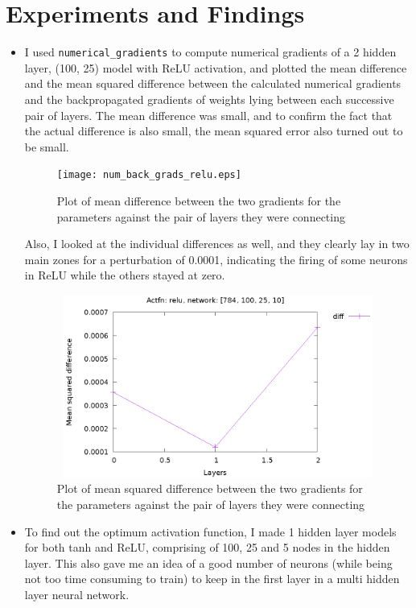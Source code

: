 \documentclass[12pt, a4paper]{article}
\begin{document}
\section{Experiments and Findings}
\begin{itemize}
\item I used \texttt{numerical\_gradients} to compute numerical gradients of a 2 hidden layer, (100, 25) model with ReLU activation, and plotted the mean difference and the mean squared difference between the calculated numerical gradients and the backpropagated gradients of weights lying between each successive pair of layers. The mean difference was small, and to confirm the fact that the actual difference is also small, the mean squared error also turned out to be small. 

\begin{figure}[h!]
\centering
\texttt{[image: num\_back\_grads\_relu.eps]}
\caption{Plot of mean difference between the two gradients for the parameters against the pair of layers they were connecting}
\end{figure}

Also, I looked at the individual differences as well, and they clearly lay in two main zones for a perturbation of 0.0001, indicating the firing of some neurons in ReLU while the others stayed at zero.


\begin{figure}[h!]
\centering
\includegraphics[width=12cm, height=6cm]{num_back_grads_relu_var.eps}
\caption{Plot of mean squared difference between the two gradients for the parameters against the pair of layers they were connecting}
\end{figure}

\item To find out the optimum activation function, I made 1 hidden layer models for both tanh and ReLU, comprising of 100, 25 and 5 nodes in the hidden layer. This also gave me an idea of a good number of neurons (while being not too time consuming to train) to keep in the first layer in a multi hidden layer neural network. 


\end{itemize}
\end{document}
